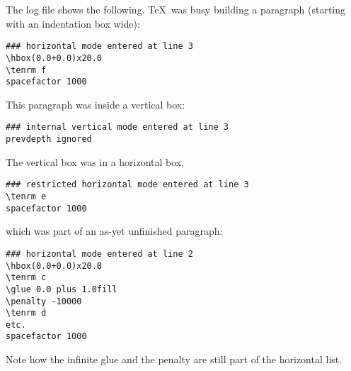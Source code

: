 \documentclass{book}
\begin{document}
The log file shows the following. \TeX\ was busy
building a paragraph (starting with an indentation box
\n{20pt} wide):\begin{verbatim}
### horizontal mode entered at line 3
\hbox(0.0+0.0)x20.0
\tenrm f
spacefactor 1000
\end{verbatim}
This paragraph was inside a vertical box:\begin{verbatim}
### internal vertical mode entered at line 3
prevdepth ignored
\end{verbatim}
The vertical box was in  a horizontal box, 
\begin{verbatim}
### restricted horizontal mode entered at line 3
\tenrm e
spacefactor 1000
\end{verbatim}
which was part of
an as-yet unfinished paragraph:\begin{verbatim}
### horizontal mode entered at line 2
\hbox(0.0+0.0)x20.0
\tenrm c
\glue 0.0 plus 1.0fill
\penalty -10000
\tenrm d
etc.
spacefactor 1000
\end{verbatim}
Note how the infinite glue and the  penalty
are still part of the horizontal list.
\end{document}
